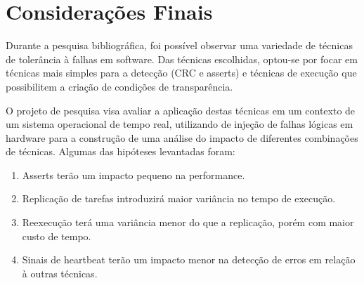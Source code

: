 \chapter{Considerações Finais}
\label{cap:consid}

Durante a pesquisa bibliográfica, foi possível observar uma variedade de técnicas de tolerância à falhas em software. Das técnicas escolhidas, optou-se por focar em técnicas mais simples para a detecção (CRC e asserts) e técnicas de execução que possibilitem a criação de condições de transparência.

O projeto de pesquisa visa avaliar a aplicação destas técnicas em um contexto de um sistema operacional de tempo real, utilizando de injeção de falhas lógicas em hardware para a construção de uma análise do impacto de diferentes combinações de técnicas. Algumas das hipóteses levantadas foram:

\begin{enumerate}
    \item Asserts terão um impacto pequeno na performance.
    \item Replicação de tarefas introduzirá maior variância no tempo de execução.
    \item Reexecução terá uma variância menor do que a replicação, porém com maior custo de tempo.
    \item Sinais de heartbeat terão um impacto menor na detecção de erros em relação à outras técnicas.
\end{enumerate}

